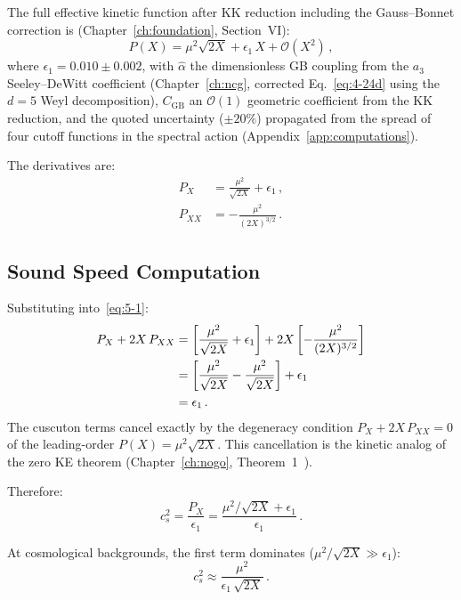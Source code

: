 The full effective kinetic function after KK reduction including the Gauss--Bonnet correction is (Chapter~\ref{ch:foundation}, Section~VI):
\begin{equation}
  P(X) = \mu^2\sqrt{2X} + \epsilon_1\,X + \mathcal{O}(X^2)\,,
  \label{eq:5-2}
\end{equation}
where $\epsilon_1 = 0.010 \pm 0.002$, with $\hat{\alpha}$ the dimensionless GB coupling from the $a_3$ Seeley--DeWitt coefficient (Chapter~\ref{ch:ncg}, corrected Eq.~\eqref{eq:4-24d} using the $d = 5$ Weyl decomposition), $C_\mathrm{GB}$ an $\mathcal{O}(1)$ geometric coefficient from the KK reduction, and the quoted uncertainty ($\pm 20\%$) propagated from the spread of four cutoff functions in the spectral action (Appendix~\ref{app:computations}).

The derivatives are:
\begin{align}
  P_X    &= \frac{\mu^2}{\sqrt{2X}} + \epsilon_1\,,   \label{eq:5-3} \\[6pt]
  P_{XX} &= -\frac{\mu^2}{(2X)^{3/2}}\,.              \label{eq:5-4}
\end{align}

\subsection{Sound Speed Computation}
\label{sec:5-sound-speed-computation}

Substituting into~\eqref{eq:5-1}:
\begin{align}
  P_X + 2X\,P_{XX}
    &= \left[\frac{\mu^2}{\sqrt{2X}} + \epsilon_1\right]
       + 2X\left[-\frac{\mu^2}{(2X)^{3/2}}\right] \notag \\
    &= \left[\frac{\mu^2}{\sqrt{2X}} - \frac{\mu^2}{\sqrt{2X}}\right] + \epsilon_1 \notag \\
    &= \epsilon_1\,.
  \label{eq:5-5}
\end{align}
The cuscuton terms cancel exactly by the degeneracy condition $P_X + 2X\,P_{XX} = 0$ of the leading-order $P(X) = \mu^2\sqrt{2X}$. This cancellation is the kinetic analog of the zero KE theorem (Chapter~\ref{ch:nogo}, Theorem~1~\cite{ch5:PaperIII}).

Therefore:
\begin{equation}
  c_s^2 = \frac{P_X}{\epsilon_1}
        = \frac{\mu^2/\sqrt{2X} + \epsilon_1}{\epsilon_1}\,.
  \label{eq:5-6}
\end{equation}

At cosmological backgrounds, the first term dominates ($\mu^2/\sqrt{2X} \gg \epsilon_1$):
\begin{equation}
  c_s^2 \approx \frac{\mu^2}{\epsilon_1\,\sqrt{2X}}\,.
  \label{eq:5-7}
\end{equation}

